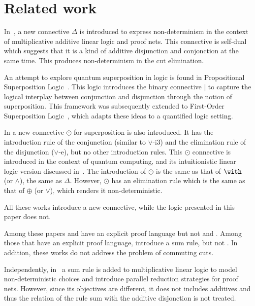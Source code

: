 \section{Related work}
In~\cite{SatoshiIPSJ96}, a new connective $\Delta$ is introduced to
express non-deter\-min\-ism in the context of multiplicative additive
linear logic and proof nets. This connective is self-dual which
suggests that it is a kind of additive disjunction and conjonction at
the same time. This produces non-determinism in the cut elimination.

An attempt to explore quantum superposition in logic is found in
Propositional Superposition Logic~\cite{TzouvarasIGPL17}. This logic
introduces the binary connective $|$ to capture the logical interplay
between conjunction and disjunction through the notion of
superposition. This framework was subsequently extended to First-Order
Superposition Logic~\cite{TzouvarasIGPL19}, which adapts these
ideas to a quantified logic setting.

In \cite{DiazcaroDowekTCS23} a new connective $\odot$ for
superposition is also introduced. It has the introduction rule of the
conjunction (similar to $\vee$-i3) and the elimination rule of the
disjunction ($\vee$-e), but no other introduction rules.  This $\odot$
connective is introduced in the context of quantum computing, and its
intuitionistic linear logic version discussed
in~\cite{DiazcaroDowekMSCS24}. The introduction of $\odot$ is the same
as that of $\with$ (or $\wedge$), the same as $\Delta$. However,
$\odot$ has an elimination rule which is the same as that of $\oplus$ (or $\vee$),
which renders it non-deterministic.

All these works introduce a new connective, while the logic presented
in this paper does not.

Among these papers \cite{SatoshiIPSJ96} and \cite{DiazcaroDowekTCS23}
have an explicit proof language  but not \cite{TzouvarasIGPL17} and
\cite{TzouvarasIGPL19}.
Among those that have an explicit proof language, 
\cite{DiazcaroDowekTCS23} introduce a sum rule, but not
\cite{SatoshiIPSJ96}.
In addition, these works do not address the problem of commuting cuts.

Independently, in~\cite{MogbilFOPARA09} a sum rule is added to multiplicative linear logic to model non-deterministic choices and introduce parallel reduction strategies for proof nets.  However, since its objectives are different, it does not includes additives and thus the relation of the rule sum with the additive disjonction is not treated.


